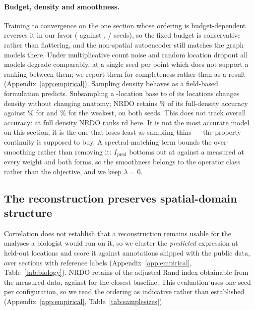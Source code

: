 \paragraph{Budget, density and smoothness.}
Training to convergence on the one section whose ordering is budget-dependent
reverses it in our favor (\ConvNMO{} against \ConvBest{},
\ConvWins{}/\ConvNPairs{} seeds), so the fixed budget is conservative rather than
flattering, and the non-spatial autoencoder still matches the graph models there.
Under multiplicative count noise and random location dropout all models degrade
comparably, at a single seed per point which does not support a ranking between
them; we report them for completeness rather than as a result
(Appendix~\ref{app:empirical}). Sampling density behaves as a field-based formulation predicts. Subsampling a
\DensBase-location base to \DensLevel{} of its locations changes density without
changing anatomy; NRDO retains \DensNMO\% of its full-density accuracy against
\DensBest\% for \DensBestModel{} and \DensWorst\% for the weakest, on both
seeds. This does not track overall accuracy: at full density NRDO ranks
\DensNMOFullRank{}rd here. It is not the most accurate model on this section, it
is the one that loses least as sampling thins --- the property continuity is
supposed to buy.
A spectral-matching term bounds the over-smoothing rather than removing it:
$I_{\mathrm{pred}}$ bottoms out at \SpecMinIPred{} against a measured
\SpecITrue{} at every weight and both forms, so the smoothness belongs to the
operator class rather than the objective, and we keep $\lambda = 0$.

\subsection{The reconstruction preserves spatial-domain structure}
\label{sec:biology}

Correlation does not establish that a reconstruction remains usable for the
analyses a biologist would run on it, so we cluster the \emph{predicted}
expression at held-out locations and score it against annotations shipped with
the public data, over \BioSections{} sections with reference labels
(Appendix~\ref{app:empirical}, Table~\ref{tab:biology}). NRDO retains
\BioARIRet{} of the adjusted Rand index obtainable from the measured data,
against \BioARIRetBest{} for the closest baseline. This evaluation uses one seed
per configuration, so we read the ordering as indicative rather than established
(Appendix~\ref{app:empirical}, Table~\ref{tab:samplesizes}).

